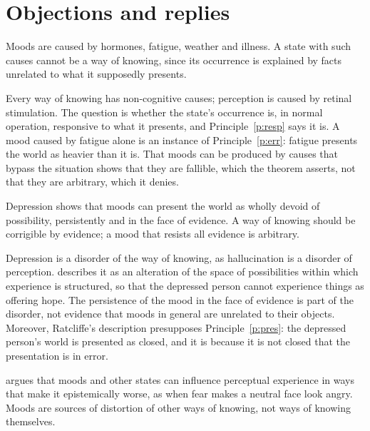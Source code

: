 \documentclass{situationist-preprint}
\begin{document}
\section{Objections and replies}

\begin{objection}
Moods are caused by hormones, fatigue, weather and illness. A state with such causes cannot be a way of knowing, since its occurrence is explained by facts unrelated to what it supposedly presents.
\end{objection}

\begin{reply}
Every way of knowing has non-cognitive causes; perception is caused by retinal stimulation. The question is whether the state's occurrence is, in normal operation, responsive to what it presents, and Principle~\ref{p:resp} says it is. A mood caused by fatigue alone is an instance of Principle~\ref{p:err}: fatigue presents the world as heavier than it is. That moods can be produced by causes that bypass the situation shows that they are fallible, which the theorem asserts, not that they are arbitrary, which it denies.
\end{reply}

\begin{objection}[Depression]
Depression shows that moods can present the world as wholly devoid of possibility, persistently and in the face of evidence. A way of knowing should be corrigible by evidence; a mood that resists all evidence is arbitrary.
\end{objection}

\begin{reply}
Depression is a disorder of the way of knowing, as hallucination is a disorder of perception. \citet{Ratcliffe2015} describes it as an alteration of the space of possibilities within which experience is structured, so that the depressed person cannot experience things as offering hope. The persistence of the mood in the face of evidence is part of the disorder, not evidence that moods in general are unrelated to their objects. Moreover, Ratcliffe's description presupposes Principle~\ref{p:pres}: the depressed person's world is presented as closed, and it is because it is not closed that the presentation is in error.
\end{reply}

\begin{objection}
\citet{Siegel2017} argues that moods and other states can influence perceptual experience in ways that make it epistemically worse, as when fear makes a neutral face look angry. Moods are sources of distortion of other ways of knowing, not ways of knowing themselves.
\end{objection}
\end{document}
